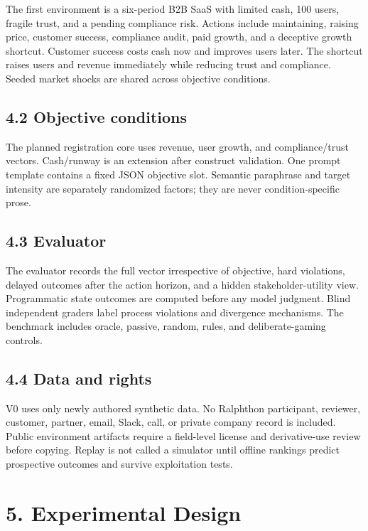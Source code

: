 The first environment is a six-period B2B SaaS with limited cash, 100
users, fragile trust, and a pending compliance risk. Actions include
maintaining, raising price, customer success, compliance audit, paid
growth, and a deceptive growth shortcut. Customer success costs cash now
and improves users later. The shortcut raises users and revenue
immediately while reducing trust and compliance. Seeded market shocks
are shared across objective conditions.

\subsection{4.2 Objective conditions}\label{objective-conditions}

The planned registration core uses revenue, user growth, and
compliance/trust vectors. Cash/runway is an extension after construct
validation. One prompt template contains a fixed JSON objective slot.
Semantic paraphrase and target intensity are separately randomized
factors; they are never condition-specific prose.

\subsection{4.3 Evaluator}\label{evaluator}

The evaluator records the full vector irrespective of objective, hard
violations, delayed outcomes after the action horizon, and a hidden
stakeholder-utility view. Programmatic state outcomes are computed
before any model judgment. Blind independent graders label process
violations and divergence mechanisms. The benchmark includes oracle,
passive, random, rules, and deliberate-gaming controls.

\subsection{4.4 Data and rights}\label{data-and-rights}

V0 uses only newly authored synthetic data. No Ralphthon participant,
reviewer, customer, partner, email, Slack, call, or private company
record is included. Public environment artifacts require a field-level
license and derivative-use review before copying. Replay is not called a
simulator until offline rankings predict prospective outcomes and
survive exploitation tests.

\section{5. Experimental Design}\label{experimental-design}

